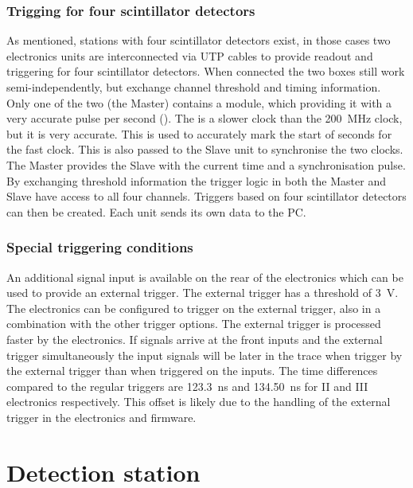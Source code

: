 \subsubsection{Trigging for four scintillator detectors}

As mentioned, stations with four scintillator detectors exist, in those cases two \hisparc electronics units are interconnected via UTP cables to provide readout and triggering for four scintillator detectors. When connected the two boxes still work semi-independently, but exchange channel threshold and timing information. Only one of the two (the Master) contains a \gps module, which providing it with a very accurate pulse per second (\pps). The \pps is a slower clock than the \SI{200}{\mega\hertz} clock, but it is very accurate. This \pps is used to accurately mark the start of seconds for the fast clock. This \pps is also passed to the Slave unit to synchronise the two clocks. The Master provides the Slave with the current time and a synchronisation pulse. By exchanging threshold information the trigger logic in both the Master and Slave have access to all four channels. Triggers based on four scintillator detectors can then be created. Each unit sends its own data to the PC.


\subsubsection{Special triggering conditions}
\label{sssec:external-trigger}

An additional signal input is available on the rear of the \hisparc electronics which can be used to provide an external trigger. The external trigger has a threshold of \SI{+3}{\volt}. The electronics can be configured to trigger on the external trigger, also in a combination with the other trigger options. The external trigger is processed faster by the electronics. If signals arrive at the front inputs and the external trigger simultaneously the input signals will be later in the trace when trigger by the external trigger than when triggered on the inputs. The time differences compared to the regular triggers are \SI{123.3}{\ns} and \SI{134.50}{\ns} for \hisparc II and III electronics respectively. This offset is likely due to the handling of the external trigger in the electronics and firmware.


\section{Detection station}

